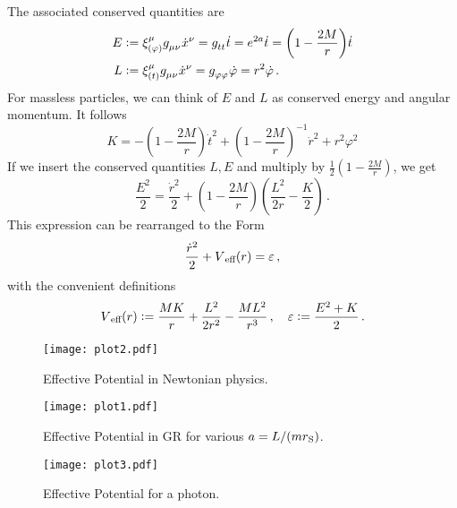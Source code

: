 The associated conserved quantities are
\begin{align}
E&:=\tensor*{\xi}{_{(\varphi)}^\mu}\tensor{g}{_\mu_\nu}\tensor{\dot{x}}{^\nu}
=\tensor{g}{_t_t}\dot{t}
=e^{2a}\dot{t}
=\left(1-\frac{2M}{r}\right)\dot{t}
\\
L&:=\tensor*{\xi}{_{(t)}^\mu}\tensor{g}{_\mu_\nu}\tensor{\dot{x}}{^\nu}
=\tensor{g}{_\varphi_\varphi}\dot{\varphi}
=r^2\dot{\varphi}\,.
\end{align}
For massless
particles, we can think of $E$ and $L$ as conserved energy and angular momentum.
It follows
\begin{equation}
K=-\left(1-\frac{2M}{r}\right)\dot{t}^2+\left(1-\frac{2M}{r}\right)^{-1}\dot{r}^2+r^2\varphi^2
\end{equation}
If we insert the conserved quantities $L,E$ and multiply by
$\frac{1}{2}\left(1-\frac{2M}{r}\right)$, we get
\begin{equation}
\frac{E^2}{2}=\frac{\dot{r}^2}{2}
+\left(1-\frac{2M}{r}\right)\left(\frac{L^2}{2r}-\frac{K}{2}\right)\,.
\end{equation}
This expression can be rearranged to the Form
\begin{equation}
\frac{\dot{r}^2}{2}+V\textsubscript{eff}(r)
=\varepsilon\,,
\end{equation}
with the convenient definitions 
\begin{equation}
V\textsubscript{eff}(r):=\frac{MK}{r}+\frac{L^2}{2r^2}-\frac{ML^2}{r^3}\,,\quad
\varepsilon:=\frac{E^2+K}{2}\,.
\end{equation}
\begin{figure}[hbtp!]
\centering
 \texttt{[image: plot2.pdf]}
\caption{Effective Potential in Newtonian physics.}
\end{figure}
\begin{figure}[hbtp!]
\centering
 \texttt{[image: plot1.pdf]}
\caption{Effective Potential in GR for various
$a=L/(mr\textsubscript{S})$.}
\end{figure}
\begin{figure}[hbtp!]
\centering
 \texttt{[image: plot3.pdf]}
\caption{Effective Potential for a photon.}
\end{figure}

